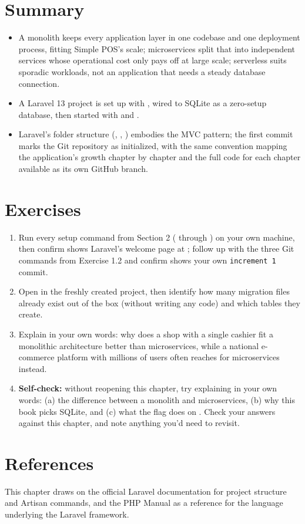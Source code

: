
\section{Summary}
\label{sec:arsitektur-web-modern-rangkuman}

\begin{itemize}
  \item A monolith keeps every application layer in one codebase and one
    deployment process, fitting Simple POS's scale; microservices split
    that into independent services whose operational cost only pays off at
    large scale; serverless suits sporadic workloads, not an application
    that needs a steady database connection.
  \item A Laravel 13 project is set up with ,
    wired to SQLite as a zero-setup database, then started with
     and .
  \item Laravel's folder structure (, ,
    ) embodies the MVC pattern; the first
     commit marks the Git repository as initialized,
    with the same convention mapping the application's growth chapter by
    chapter and the full code for each chapter available as its own
    GitHub branch.
\end{itemize}

\section{Exercises}

\begin{enumerate}
  \item Run every setup command from Section 2 ( through ) on your own machine, then
    confirm  shows Laravel's welcome page at
    ; follow up with the three Git commands
    from Exercise 1.2 and confirm  shows your own
    \texttt{increment 1} commit.
  \item Open  in the freshly created project,
    then identify how many migration files already exist out of the box
    (without writing any code) and which tables they create.
  \item Explain in your own words: why does a shop with a single cashier
    fit a monolithic architecture better than microservices, while a
    national e-commerce platform with millions of users often reaches for
    microservices instead.
  \item \textbf{Self-check:} without reopening this chapter, try explaining
    in your own words: (a) the difference between a monolith and
    microservices, (b) why this book picks SQLite, and (c) what the
     flag does on . Check your answers
    against this chapter, and note anything you'd need to revisit.
\end{enumerate}

\section{References}

This chapter draws on the official Laravel documentation
\cite{laraveldocs} for project structure and Artisan commands, and the PHP
Manual \cite{phpmanual} as a reference for the language underlying the
Laravel framework.
